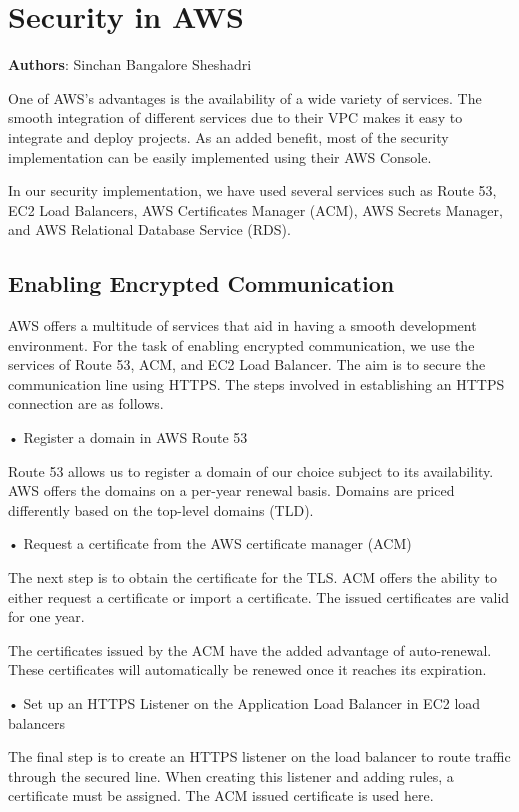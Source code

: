 \section{Security in AWS}

\textbf{Authors}: Sinchan Bangalore Sheshadri



One of AWS’s advantages is the availability of a wide variety of services. The smooth integration of different services due to their VPC makes it easy to integrate and deploy projects. As an added benefit, most of the security implementation can be easily implemented using their AWS Console.

In our security implementation, we have used several services such as Route 53, EC2 Load Balancers, AWS Certificates Manager (ACM), AWS Secrets Manager, and AWS Relational Database Service (RDS).


\subsection{Enabling Encrypted Communication}

AWS offers a multitude of services that aid in having a smooth development environment. For the task of enabling encrypted communication, we use the services of Route 53, ACM, and EC2 Load Balancer. The aim is to secure the communication line using HTTPS. The steps involved in establishing an HTTPS connection are as follows.

•	Register a domain in AWS Route 53

Route 53 allows us to register a domain of our choice subject to its availability. AWS offers the domains on a per-year renewal basis. Domains are priced differently based on the top-level domains (TLD).


•	Request a certificate from the AWS certificate manager (ACM)

The next step is to obtain the certificate for the TLS. ACM offers the ability to either request a certificate or import a certificate. The issued certificates are valid for one year.

The certificates issued by the ACM have the added advantage of auto-renewal. These certificates will automatically be renewed once it reaches its expiration.


•	Set up an HTTPS Listener on the Application Load Balancer in EC2 load balancers

The final step is to create an HTTPS listener on the load balancer to route traffic through the secured line. When creating this listener and adding rules, a certificate must be assigned. The ACM issued certificate is used here.

